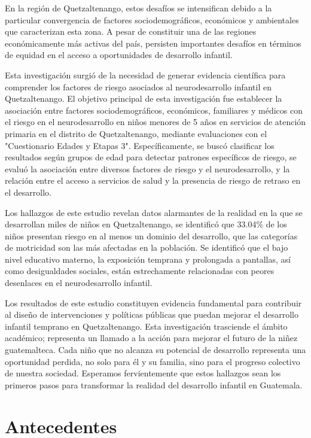 \documentclass[11pt,letterpaper]{report}
\newcommand{\asq}{"Cuestionario Edades y Etapas 3"}
\begin{document}
En la región de Quetzaltenango, estos desafíos se intensifican debido a la 
particular convergencia de factores sociodemográficos, económicos y 
ambientales que caracterizan esta zona. A pesar de constituir una de las
regiones económicamente más activas del país, persisten importantes desafíos en
términos de equidad en el acceso a oportunidades de desarrollo infantil.

Esta investigación surgió de la necesidad de generar evidencia científica para
comprender los factores de riesgo asociados al neurodesarrollo infantil
en Quetzaltenango. El objetivo principal de esta investigación fue establecer la
asociación entre factores sociodemográficos, económicos, familiares y médicos
con el riesgo en el neurodesarrollo en niños menores de 5 años en servicios de 
atención primaria en el distrito de Quetzaltenango, mediante evaluaciones con
el \asq. Específicamente, se buscó clasificar los resultados
según grupos de edad para detectar patrones específicos de riesgo, se evaluó
la asociación entre diversos factores de riesgo y el neurodesarrollo, y la
relación entre el acceso a servicios de salud y la presencia de riesgo de
retraso en el desarrollo.

Los hallazgos de este estudio revelan datos alarmantes de la realidad en la que
se desarrollan miles de niños en Quetzaltenango, se identificó que 33.04\% de
los niños presentan riesgo en al menos un dominio del desarrollo, que las
categorías de motricidad son las más afectadas en la población. Se identificó
que el bajo nivel educativo materno, la exposición temprana y prolongada a
pantallas, así como desigualdades sociales, están estrechamente relacionadas
con peores desenlaces en el neurodesarrollo infantil.

Los resultados de este estudio constituyen evidencia fundamental para contribuir
al diseño de intervenciones y políticas públicas que puedan mejorar el
desarrollo infantil temprano en Quetzaltenango. Esta investigación trasciende el
ámbito académico; representa un llamado a la acción para mejorar el futuro de la
niñez guatemalteca. Cada niño que no alcanza su potencial de desarrollo
representa una oportunidad perdida, no solo para él y su familia, sino para el
progreso colectivo de nuestra sociedad. Esperamos fervientemente que estos
hallazgos sean los primeros pasos para transformar la realidad del desarrollo
infantil en Guatemala.

	\chapter{Antecedentes}
\end{document}
